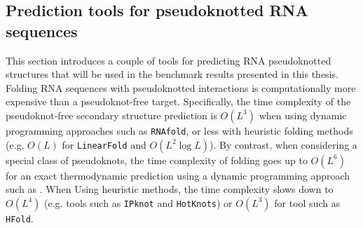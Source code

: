 \subsection{Prediction tools for pseudoknotted RNA sequences}
This section introduces a couple of tools for predicting RNA pseudoknotted structures that will be used in the benchmark results presented in this thesis. Folding RNA sequences with pseudoknotted interactions is computationally more expensive than a pseudoknot-free target. Specifically, the time complexity of the pseudoknot-free secondary structure prediction is $O(L^3)$ when using dynamic programming approaches such as \texttt{RNAfold},  or less with heuristic folding methods (e.g. $O(L)$ for \texttt{LinearFold} and $O(L^2\log L)$). By contrast, when considering a special class of pseudoknots, the time complexity of folding goes up to $O(L^6)$ for an exact thermodynamic prediction using a dynamic programming approach such as \cite{pseudoknotDP}. When Using heuristic methods, the time complexity slows down to $O(L^4)$ (e.g. tools such as \texttt{IPknot} and \texttt{HotKnots}) or $O(L^3)$ for tool such as \texttt{HFold}.  
